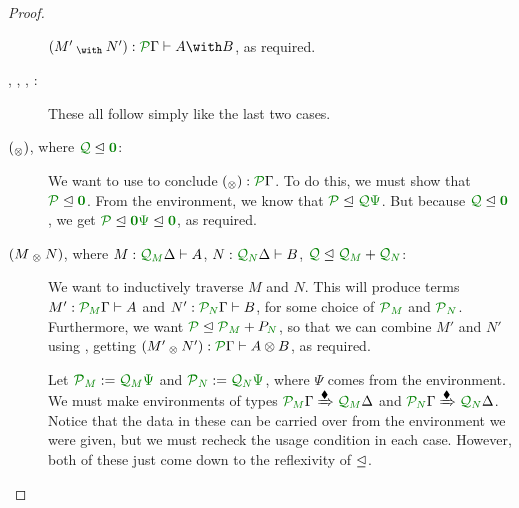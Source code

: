\documentclass[submission,copyright,creativecommons]{eptcs}
\begin{document}
\begin{proof}
\begin{description}
      $\wth{M'}{N'} : \ctx{\Gamma}{P} \vdash \withT{A}{B}$, as required.
    \item[\TirName{$\withT{}{}$-El}, \TirName{$\withT{}{}$-Er},
      \TirName{$\sumT{}{}$-Il}, \TirName{$\sumT{}{}$-Ir}:]
      These all follow simply like the last two cases.
    \item[\TirName{$\tensorOne$-I} $(\mathbin{_\otimes})$, where
      $\resctx Q \subres \rescomment{\vct 0}$:]
      We want to use  to conclude
      $\unit : \ctx{\Gamma}{P}$.
      To do this, we must show that $\resctx P \subres \rescomment{\vct 0}$.
      From the environment, we know that
      $\resctx P \subres \resctx Q\rescomment\Psi$.
      But because $\resctx Q \subres \rescomment{\vct 0}$, we get
      $\resctx P \subres \rescomment{\vct 0}\rescomment\Psi
      \subres \rescomment{\vct 0}$, as required.
    \item[\TirName{$\tensor{}{}$-I} $(M \mathbin{_{\otimes}} N)$, where
      $M : \ctx{\Delta}{Q_{\mathnormal M}} \vdash A$,
      $N : \ctx{\Delta}{Q_{\mathnormal N}} \vdash B$,
      $\resctx Q \subres \resctx Q_{\rescomment M} + \resctx Q_{\rescomment N}$:]
      We want to inductively traverse $M$ and $N$.
      This will produce terms
      $M' : \ctx{\Gamma}{P_{\mathnormal M}} \vdash A$ and
      $N' : \ctx{\Gamma}{P_{\mathnormal N}} \vdash B$, for some choice of
      $\resctx P_{\rescomment M}$ and $\resctx P_{\rescomment N}$.
      Furthermore, we want
      $\resctx P \subres \resctx P_{\rescomment M} + P_{\rescomment N}$, so that
      we can combine $M'$ and $N'$ using , getting
      $\ten{M'}{N'} : \ctx{\Gamma}{P} \vdash \tensor{A}{B}$, as required.

      Let
      $\resctx P_{\rescomment M} := \resctx Q_{\rescomment M}\rescomment\Psi$
      and
      $\resctx P_{\rescomment N} := \resctx Q_{\rescomment N}\rescomment\Psi$,
      where $\Psi$ comes from the environment.
      We must make environments of types
      $\ctx{\Gamma}{P_{\mathnormal M}}
      \subst{\kitrel} \ctx{\Delta}{Q_{\mathnormal M}}$
      and
      $\ctx{\Gamma}{P_{\mathnormal N}}
      \subst{\kitrel} \ctx{\Delta}{Q_{\mathnormal N}}$.
      Notice that the data in these can be carried over from the environment we
      were given, but we must recheck the usage condition in each case.
      However, both of these just come down to the reflexivity of $\trianglelefteq$.


\end{description}
\end{proof}
\end{document}
